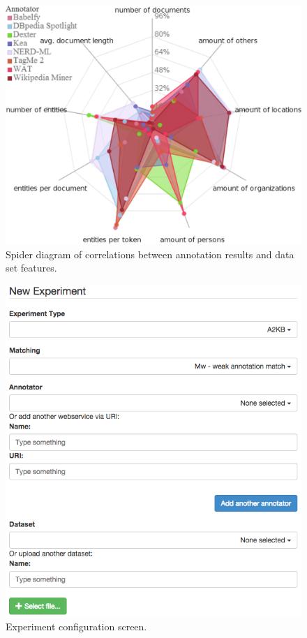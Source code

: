 \begin{figure}[htb]
\centering
\includegraphics[width=\textwidth]{part_02/benchmarking/ESWC_GERBIL_demo/correlations.pdf}
\caption{Spider diagram of correlations between annotation results and data set features.}
\label{cha333:fig:spiderfeature}
\end{figure}


\begin{figure}
\centering
\includegraphics[width=0.95\linewidth]{part_02/benchmarking/ESWC_GERBIL_demo/screenshot}
\caption{Experiment configuration screen.}
\label{cha333:fig:screenshot}
\end{figure}

